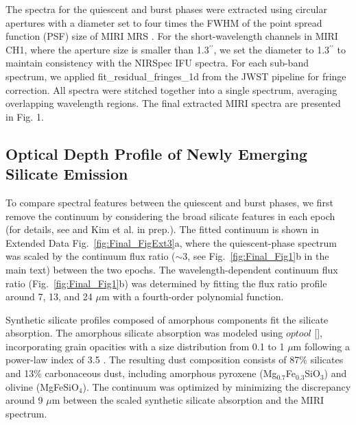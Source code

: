 \documentclass[pdflatex,sn-mathphys-num]{sn-jnl}
\theoremstyle{thmstyleone}
\theoremstyle{thmstyletwo}
\theoremstyle{thmstylethree}
\begin{document}
\begin{bibunit}
The spectra for the quiescent and burst phases were extracted using circular apertures with a diameter set to four times the FWHM of the point spread function (PSF) size of MIRI MRS \citep{Law2023}. For the short-wavelength channels in MIRI CH1, where the aperture size is smaller than 1.3$^{\prime\prime}$, we set the diameter to 1.3$^{\prime\prime}$ to maintain consistency with the NIRSpec IFU spectra. For each sub-band spectrum, we applied fit\_residual\_fringes\_1d from the JWST pipeline for fringe correction. All spectra were stitched together into a single spectrum, averaging overlapping wavelength regions.
The final extracted MIRI spectra are presented in Fig. 1.

\subsection{Optical Depth Profile of Newly Emerging Silicate Emission}

To compare spectral features between the quiescent and burst phases, we first remove the continuum by considering the broad silicate features in each epoch (for details, see \citep{kim2025} and Kim et al. in prep.). The fitted continuum is shown in Extended Data Fig.~\ref{fig:Final_FigExt3}a, where the quiescent-phase spectrum was scaled by the continuum flux ratio ($\sim$3, see Fig.~\ref{fig:Final_Fig1}b in the main text) between the two epochs.
The wavelength-dependent continuum flux ratio (Fig.~\ref{fig:Final_Fig1}b) was determined by fitting the flux ratio profile around 7, 13, and 24 $\mu$m with a fourth-order polynomial function.

Synthetic silicate profiles composed of amorphous components fit the silicate absorption. The amorphous silicate absorption was modeled using $optool$ [], incorporating grain opacities with a size distribution from 0.1 to 1 $\mu$m following a power-law index of 3.5 \citep{MRN1977}. The resulting dust composition consists of 87\% silicates and 13\% carbonaceous dust, including amorphous pyroxene (Mg$_{0.7}$Fe$_{0.3}$SiO$_3$) and olivine (MgFeSiO$_4$). The continuum was optimized by minimizing the discrepancy around 9 $\mu$m between the scaled synthetic silicate absorption and the MIRI spectrum.


\end{bibunit}
\end{document}
